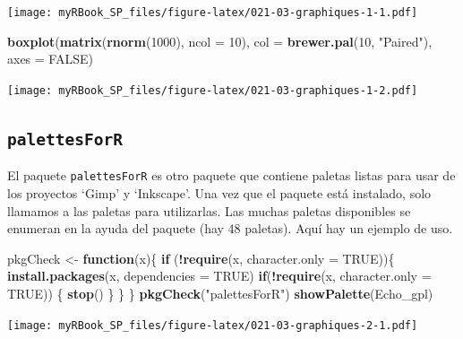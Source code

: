 \documentclass[
]{book}
\newenvironment{Shaded}{\begin{snugshade}}{\end{snugshade}}
\newcommand{\ControlFlowTok}[1]{\textcolor[rgb]{0.13,0.29,0.53}{\textbf{#1}}}
\newcommand{\DataTypeTok}[1]{\textcolor[rgb]{0.13,0.29,0.53}{#1}}
\newcommand{\DecValTok}[1]{\textcolor[rgb]{0.00,0.00,0.81}{#1}}
\newcommand{\KeywordTok}[1]{\textcolor[rgb]{0.13,0.29,0.53}{\textbf{#1}}}
\newcommand{\NormalTok}[1]{#1}
\newcommand{\OperatorTok}[1]{\textcolor[rgb]{0.81,0.36,0.00}{\textbf{#1}}}
\newcommand{\OtherTok}[1]{\textcolor[rgb]{0.56,0.35,0.01}{#1}}
\newcommand{\StringTok}[1]{\textcolor[rgb]{0.31,0.60,0.02}{#1}}
\begin{document}
\texttt{[image: myRBook\_SP\_files/figure-latex/021-03-graphiques-1-1.pdf]}

\begin{Shaded}
\begin{Highlighting}[]
\KeywordTok{boxplot}\NormalTok{(}\KeywordTok{matrix}\NormalTok{(}\KeywordTok{rnorm}\NormalTok{(}\DecValTok{1000}\NormalTok{), }\DataTypeTok{ncol =} \DecValTok{10}\NormalTok{), }
  \DataTypeTok{col =} \KeywordTok{brewer.pal}\NormalTok{(}\DecValTok{10}\NormalTok{, }\StringTok{"Paired"}\NormalTok{), }\DataTypeTok{axes =} \OtherTok{FALSE}\NormalTok{)}
\end{Highlighting}
\end{Shaded}

\texttt{[image: myRBook\_SP\_files/figure-latex/021-03-graphiques-1-2.pdf]}

\hypertarget{palettesforr}{%
\subsection{\texorpdfstring{\texttt{palettesForR}}{palettesForR}}\label{palettesforr}}

El paquete \texttt{palettesForR} es otro paquete que contiene paletas listas para usar de los proyectos `Gimp' y `Inkscape'. Una vez que el paquete está instalado, solo llamamos a las paletas para utilizarlas. Las muchas paletas disponibles se enumeran en la ayuda del paquete (hay 48 paletas). Aquí hay un ejemplo de uso.

\begin{Shaded}
\begin{Highlighting}[]
\NormalTok{pkgCheck <-}\StringTok{ }\ControlFlowTok{function}\NormalTok{(x)\{ }
    \ControlFlowTok{if}\NormalTok{ (}\OperatorTok{!}\KeywordTok{require}\NormalTok{(x, }\DataTypeTok{character.only =} \OtherTok{TRUE}\NormalTok{))\{}
        \KeywordTok{install.packages}\NormalTok{(x, }\DataTypeTok{dependencies =} \OtherTok{TRUE}\NormalTok{)}
        \ControlFlowTok{if}\NormalTok{(}\OperatorTok{!}\KeywordTok{require}\NormalTok{(x, }\DataTypeTok{character.only =} \OtherTok{TRUE}\NormalTok{)) \{}
            \KeywordTok{stop}\NormalTok{()}
\NormalTok{        \}}
\NormalTok{    \}}
\NormalTok{\}}
\KeywordTok{pkgCheck}\NormalTok{(}\StringTok{"palettesForR"}\NormalTok{)}
\KeywordTok{showPalette}\NormalTok{(Echo_gpl)}
\end{Highlighting}
\end{Shaded}

\texttt{[image: myRBook\_SP\_files/figure-latex/021-03-graphiques-2-1.pdf]}
\end{document}
